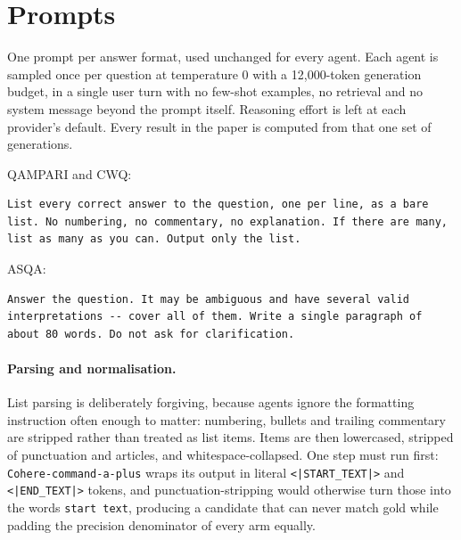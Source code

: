 \documentclass[11pt]{article}
\begin{document}
%
%




\newpage
\appendix

\section{Prompts}
\label{app:prompts}

One prompt per answer format, used unchanged for every agent. Each agent is sampled once per question at temperature 0 with a 12,000-token generation budget, in a single user turn with no few-shot examples, no retrieval and no system message beyond the prompt itself. Reasoning effort is left at each provider's default. Every result in the paper is computed from that one set of generations.

QAMPARI and CWQ:
\begin{verbatim}
List every correct answer to the question, one per line, as a bare
list. No numbering, no commentary, no explanation. If there are many,
list as many as you can. Output only the list.
\end{verbatim}

ASQA:
\begin{verbatim}
Answer the question. It may be ambiguous and have several valid
interpretations -- cover all of them. Write a single paragraph of
about 80 words. Do not ask for clarification.
\end{verbatim}

\paragraph{Parsing and normalisation.}
List parsing is deliberately forgiving, because agents ignore the formatting instruction often enough to matter: numbering, bullets and trailing commentary are stripped rather than treated as list items. Items are then lowercased, stripped of punctuation and articles, and whitespace-collapsed. One step must run first: \texttt{Cohere-command-a-plus} wraps its output in literal \verb+<|START_TEXT|>+ and \verb+<|END_TEXT|>+ tokens, and punctuation-stripping would otherwise turn those into the words \texttt{start text}, producing a candidate that can never match gold while padding the precision denominator of every arm equally.
\end{document}
